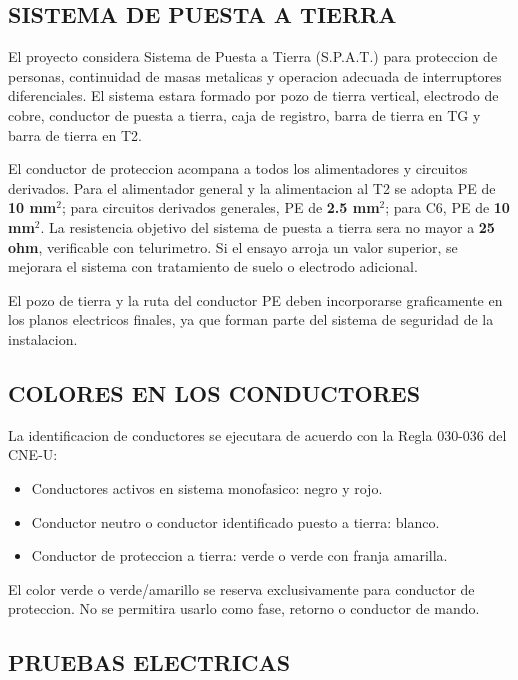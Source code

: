 \subsection{SISTEMA DE PUESTA A TIERRA}

El proyecto considera Sistema de Puesta a Tierra (S.P.A.T.) para proteccion de personas, continuidad de masas metalicas y operacion adecuada de interruptores diferenciales. El sistema estara formado por pozo de tierra vertical, electrodo de cobre, conductor de puesta a tierra, caja de registro, barra de tierra en TG y barra de tierra en T2.

El conductor de proteccion acompana a todos los alimentadores y circuitos derivados. Para el alimentador general y la alimentacion al T2 se adopta PE de \textbf{10 mm$^2$}; para circuitos derivados generales, PE de \textbf{2.5 mm$^2$}; para C6, PE de \textbf{10 mm$^2$}. La resistencia objetivo del sistema de puesta a tierra sera no mayor a \textbf{25 ohm}, verificable con telurimetro. Si el ensayo arroja un valor superior, se mejorara el sistema con tratamiento de suelo o electrodo adicional.

El pozo de tierra y la ruta del conductor PE deben incorporarse graficamente en los planos electricos finales, ya que forman parte del sistema de seguridad de la instalacion.

\subsection{COLORES EN LOS CONDUCTORES}

La identificacion de conductores se ejecutara de acuerdo con la Regla 030-036 del CNE-U:

\begin{itemize}
  \item Conductores activos en sistema monofasico: negro y rojo.
  \item Conductor neutro o conductor identificado puesto a tierra: blanco.
  \item Conductor de proteccion a tierra: verde o verde con franja amarilla.
\end{itemize}

El color verde o verde/amarillo se reserva exclusivamente para conductor de proteccion. No se permitira usarlo como fase, retorno o conductor de mando.

\subsection{PRUEBAS ELECTRICAS}

